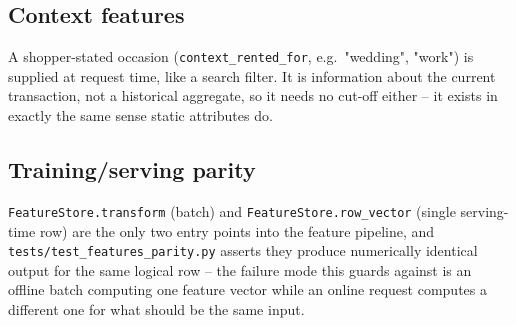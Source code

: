 \subsection{Context features}

A shopper-stated occasion (\texttt{context\_rented\_for}, e.g.\ "wedding",
"work") is supplied at request time, like a search filter. It is information
about the current transaction, not a historical aggregate, so it needs no
cut-off either -- it exists in exactly the same sense static attributes do.

\subsection{Training/serving parity}

\texttt{FeatureStore.transform} (batch) and \texttt{FeatureStore.row\_vector}
(single serving-time row) are the only two entry points into the feature
pipeline, and \texttt{tests/test\_features\_parity.py} asserts they produce
numerically identical output for the same logical row -- the failure mode
this guards against is an offline batch computing one feature vector while
an online request computes a different one for what should be the same
input.

